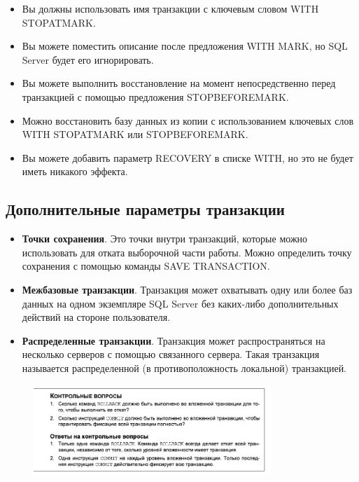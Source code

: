 \begin{itemize}
	\item Вы должны использовать имя транзакции с ключевым словом WITH STOPATMARK. 
	\item Вы можете поместить описание после предложения WITH MARK, но SQL Server
	будет его игнорировать. 
	\item Вы можете выполнить восстановление на момент непосредственно перед транзакцией с помощью предложения STOPBEFOREMARK. 
	\item Можно восстановить базу данных из копии с использованием ключевых слов
	WITH STOPATMARK или STOPBEFOREMARK. 
	\item Вы можете добавить параметр RECOVERY в списке WITH, но это не будет иметь
	никакого эффекта. 
\end{itemize}


\subsection{Дополнительные параметры транзакции}

\begin{itemize}
	\item \textbf{Точки сохранения}. Это точки внутри транзакций, которые можно использовать
	для отката выборочной части работы. Можно определить точку сохранения с помощью команды SAVE TRANSACTION.
	\item \textbf{Межбазовые транзакции}. Транзакция может охватывать одну или более баз
	данных на одном экземпляре SQL Server без каких-либо дополнительных действий на стороне пользователя. 
	\item \textbf{Распределенные транзакции}. Транзакция может распространяться на несколько серверов с помощью связанного сервера. Такая транзакция называется распределенной (в противоположность локальной) транзакцией. 
\end{itemize}

\begin{figure}[h!]
	\begin{center}
		\includegraphics[width=0.8\textwidth]{img/control29.png}
	\end{center}
	\captionsetup{justification=centering}
\end{figure}


